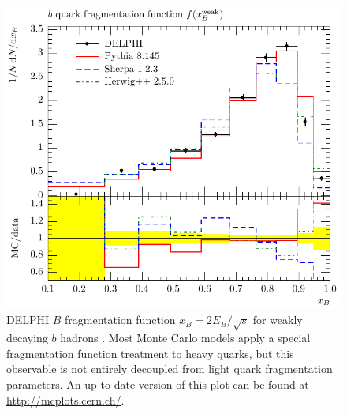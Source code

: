 \begin{figure}[tp]
  \centering
  \includegraphics[scale=0.7]{mc-plots/DELPHI_2002_069_CONF_603-cmp/DELPHI_2002_069_CONF_603_d02-x01-y01}
  \caption{DELPHI $B$ fragmentation function $x_B = 2 E_B / \sqrt{s}$
    for weakly decaying $b$ hadrons \cite{Barker:2002}. Most Monte Carlo
    models apply a special fragmentation function treatment to heavy
    quarks, but this observable is not entirely decoupled from light
    quark fragmentation parameters. An up-to-date version of this plot
    can be found at \url{http://mcplots.cern.ch/}.}
  \label{fig:cmp:bfragfunction}
\end{figure}

